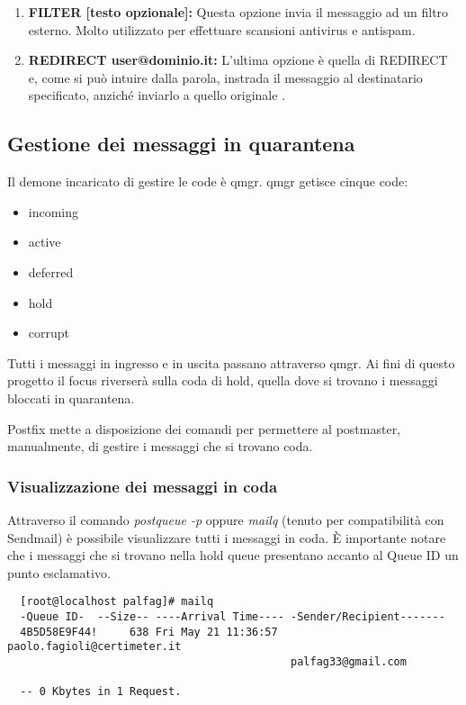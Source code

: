 \begin{table}[htp]
\begin{enumerate}[label=\textbf{\arabic*})]
      \item{\textbf{FILTER [testo opzionale]:}}
      Questa opzione invia il messaggio ad un filtro esterno. Molto utilizzato per effettuare scansioni 
      antivirus e antispam.
      
      \item{\textbf{REDIRECT user@dominio.it:}} 
      L'ultima opzione è quella di REDIRECT e, come si può intuire dalla parola, instrada il messaggio al 
      destinatario specificato, anziché inviarlo a quello originale \cite{hildebrandt2005book}.
  \end{enumerate}
  \end{table}
  
  \pagebreak
  \begin{table}[htp]
    \subsection{Gestione dei messaggi in quarantena}
    Il demone incaricato di gestire le code è qmgr. qmgr getisce cinque code:
    \begin{itemize}
      \item incoming
      \item active
      \item deferred
      \item hold
      \item corrupt
    \end{itemize}
  \end{table}
  
  Tutti i messaggi in ingresso e in uscita passano attraverso qmgr. Ai fini di questo progetto il focus riverserà
  sulla coda di hold, quella dove si trovano i messaggi bloccati in quarantena.
  
  Postfix mette a disposizione dei comandi per permettere al postmaster, manualmente, di gestire i messaggi che si 
  trovano coda.
  
  \subsubsection{Visualizzazione dei messaggi in coda}
  Attraverso il comando \textit{postqueue -p} oppure \textit{mailq} (tenuto per compatibilità con Sendmail) è possibile visualizzare tutti
  i messaggi in coda. È importante notare che i messaggi che si trovano nella hold queue presentano accanto al Queue ID 
  un punto esclamativo.
  
  \begin{verbatim}
  [root@localhost palfag]# mailq
  -Queue ID-  --Size-- ----Arrival Time---- -Sender/Recipient-------
  4B5D58E9F44!     638 Fri May 21 11:36:57  paolo.fagioli@certimeter.it
                                            palfag33@gmail.com
  
  -- 0 Kbytes in 1 Request.
  \end{verbatim}
  
